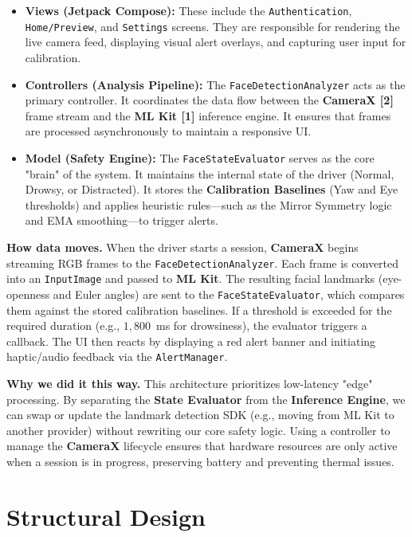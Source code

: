 \documentclass[11pt]{report}
\begin{document}
\begin{itemize}
    \item \textbf{Views (Jetpack Compose):} These include the \texttt{Authentication}, \texttt{Home/Preview}, and \texttt{Settings} screens. They are responsible for rendering the live camera feed, displaying visual alert overlays, and capturing user input for calibration.
    \item \textbf{Controllers (Analysis Pipeline):} The \texttt{FaceDetectionAnalyzer} acts as the primary controller. It coordinates the data flow between the \textbf{CameraX [2]} frame stream and the \textbf{ML Kit [1]} inference engine. It ensures that frames are processed asynchronously to maintain a responsive UI.
    \item \textbf{Model (Safety Engine):} The \texttt{FaceStateEvaluator} serves as the core "brain" of the system. It maintains the internal state of the driver (Normal, Drowsy, or Distracted). It stores the \textbf{Calibration Baselines} (Yaw and Eye thresholds) and applies heuristic rules—such as the Mirror Symmetry logic and EMA smoothing—to trigger alerts.
\end{itemize}

\noindent\textbf{How data moves.}
When the driver starts a session, \textbf{CameraX} begins streaming RGB frames to the \texttt{FaceDetectionAnalyzer}. Each frame is converted into an \texttt{InputImage} and passed to \textbf{ML Kit}.
The resulting facial landmarks (eye-openness and Euler angles) are sent to the \texttt{FaceStateEvaluator}, which compares them against the stored calibration baselines.
If a threshold is exceeded for the required duration (e.g., $1,800$~ms for drowsiness), the evaluator triggers a callback. The UI then reacts by displaying a red alert banner and initiating haptic/audio feedback via the \texttt{AlertManager}.

\noindent\textbf{Why we did it this way.}
This architecture prioritizes low-latency "edge" processing. By separating the \textbf{State Evaluator} from the \textbf{Inference Engine}, we can swap or update the landmark detection SDK (e.g., moving from ML Kit to another provider) without rewriting our core safety logic. Using a controller to manage the \textbf{CameraX} lifecycle ensures that hardware resources are only active when a session is in progress, preserving battery and preventing thermal issues.
\clearpage

\section{Structural Design}\label{sec:structural-design}
\end{document}

